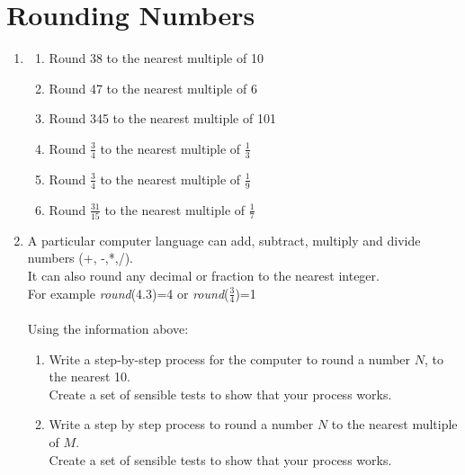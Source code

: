 \documentclass[a4paper,12pt]{article}
\begin{document}
\section{Rounding Numbers}
\begin{enumerate}
\item \begin{enumerate}[label= \roman*)]
\item Round 38 to the nearest multiple of 10
\item Round 47 to the nearest multiple of 6
\item Round 345 to the nearest multiple of 101
\item Round $\displaystyle \frac{3}{4}$ to the nearest multiple of $\displaystyle \frac{1}{3}$
\item Round $\displaystyle \frac{3}{4}$ to the nearest multiple of $\displaystyle \frac{1}{9}$
\item Round $\displaystyle \frac{31}{15}$ to the nearest multiple of $\displaystyle \frac{1}{7}$
\end{enumerate}
\item A particular computer language can add, subtract, multiply and divide numbers (+, -,*,/).\\
It can also round any decimal or fraction to the nearest integer.\\
For example \textit{round}(4.3)=4 or \textit{round}($\frac{3}{4}$)=1\\\\
Using the information above:
\begin{enumerate}[label= \roman*)]
\item Write a step-by-step process for the computer to round a number $N$, to the nearest 10.\\
Create a set of sensible tests to show that your process works.
\item Write a step by step process to round a number $N$ to the nearest multiple of $M$.\\
Create a set of sensible tests to show that your process works.
\end{enumerate}
\end{enumerate}
\newpage
\end{document}
